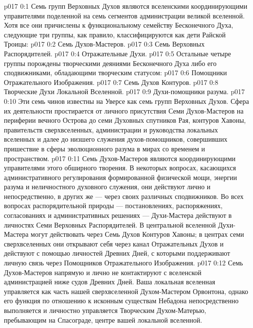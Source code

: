 \author{Божественный Советник}
\vs p017 0:1 Семь групп Верховных Духов являются вселенскими координирующими управителями поделенной на семь сегментов администрации великой вселенной. Хотя все они причислены к функциональному семейству Бесконечного Духа, следующие три группы, как правило, классифицируются как дети Райской Троицы:
\vs p017 0:2 \bibnobreakspace Семь Духов\hyp{}Мастеров.
\vs p017 0:3 \bibnobreakspace Семь Верховных Распорядителей.
\vs p017 0:4 \bibnobreakspace Отражательные Духи.
\vs p017 0:5 \pc Остальные четыре группы порождены творческими деяниями Бесконечного Духа либо его сподвижниками, обладающими творческим статусом:
\vs p017 0:6 \bibnobreakspace Помощники Отражательного Изображения.
\vs p017 0:7 \bibnobreakspace Семь Духов Контуров.
\vs p017 0:8 \bibnobreakspace Творческие Духи Локальной Вселенной.
\vs p017 0:9 \bibnobreakspace Духи\hyp{}помощники разума.
\vs p017 0:10 \pc Эти семь чинов известны на Уверсе как семь групп Верховных Духов. Сфера их деятельности простирается от личного присутствия Семи Духов\hyp{}Мастеров на периферии вечного Острова до семи Духовных спутников Рая, контуров Хавоны, правительств сверхвселенных, администрации и руководства локальных вселенных и далее до низшего служения духов\hyp{}помощников, совершивших пришествие в сферы эволюционного разума в мирах со временем и пространством.
\vs p017 0:11 Семь Духов\hyp{}Мастеров являются координирующими управителями этого обширного творения. В некоторых вопросах, касающихся административного регулирования формированной физической мощи, энергии разума и неличностного духовного служения, они действуют лично и непосредственно, в других же --- через своих различных сподвижников. Во всех вопросах распорядительной природы --- постановлениях, распоряжениях, согласованиях и административных решениях --- Духи\hyp{}Мастера действуют в личностях Семи Верховных Распорядителей. В центральной вселенной Духи\hyp{}Мастера могут действовать через Семь Духов Контуров Хавоны; в центрах семи сверхвселенных они открывают себя через канал Отражательных Духов и действуют с помощью личностей Древних Дней, с которыми поддерживают личную связь через Помощников Отражательного Изображения.
\vs p017 0:12 Семь Духов\hyp{}Мастеров напрямую и лично не контактируют с вселенской администрацией ниже судов Древних Дней. Ваша локальная вселенная управляется как часть нашей сверхвселенной Духом\hyp{}Мастером Орвонтона, однако его функция по отношению к исконным существам Небадона непосредственно выполняется и личностно управляется Творческим Духом\hyp{}Матерью, пребывающим на Спасограде, центре вашей локальной вселенной.
